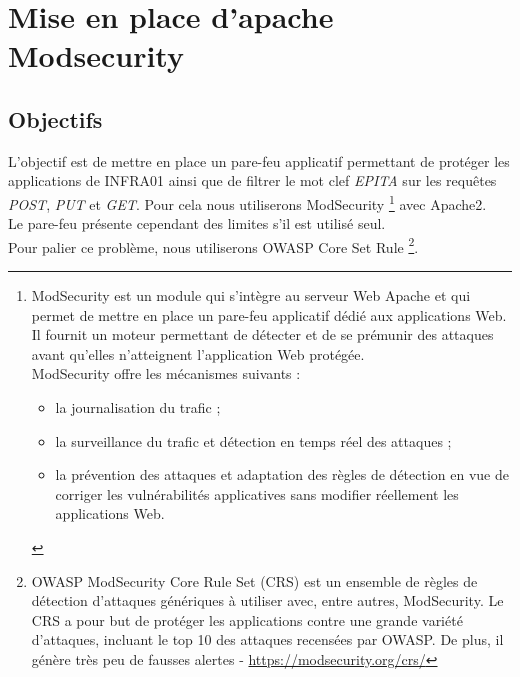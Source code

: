 \section{Mise en place d'apache Modsecurity}

\subsection{Objectifs}

L'objectif est de mettre en place un pare-feu applicatif permettant de protéger les applications de INFRA01 ainsi que de filtrer le mot clef \textit{EPITA} sur les requêtes \textit{POST}, \textit{PUT} et \textit{GET}. Pour cela nous utiliserons ModSecurity \footnote{ModSecurity est un module qui s’intègre au serveur Web Apache et qui permet de mettre en place un pare-feu applicatif dédié aux applications Web. Il fournit un moteur permettant de détecter et de se prémunir des attaques avant qu’elles n’atteignent l’application Web protégée. \\
ModSecurity offre les mécanismes suivants : 
\begin{itemize}
\item la journalisation du trafic ;
\item la surveillance du trafic et détection en temps réel des attaques ;
\item la prévention des attaques et adaptation des règles de détection en vue de corriger les vulnérabilités applicatives sans modifier réellement les applications Web.
\end{itemize}
\cite{modsecurity}} avec Apache2. \\



Le pare-feu présente cependant des limites s'il est utilisé seul. \\
Pour palier ce problème, nous utiliserons OWASP Core Set Rule \footnote{OWASP ModSecurity Core Rule Set (CRS) est un ensemble de règles de détection d'attaques génériques à utiliser avec, entre autres, ModSecurity. Le CRS a pour but de protéger les applications contre une grande variété d'attaques, incluant le top 10 des attaques recensées par OWASP. De plus, il génère très peu de fausses alertes - \url{https://modsecurity.org/crs/}}.

